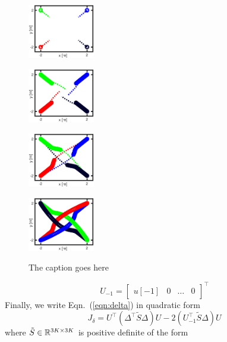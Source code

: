  \begin{figure}
 	\centering
 	\begin{subfloat}[]{
 		\includegraphics[width=0.26\textwidth]{figures/rail_a}}
 	\end{subfloat} \hspace{-5ex}
 	\begin{subfloat}[]{
 			\includegraphics[width=0.26\textwidth]{figures/rail_b}}
 	\end{subfloat} \hspace{-5ex}
 	\begin{subfloat}[]{
 			\includegraphics[width=0.26\textwidth]{figures/rail_c}}
 	\end{subfloat} \hspace{-5ex}
 	\begin{subfloat}[]{
 			\includegraphics[width=0.26\textwidth]{figures/rail_d}}
 	\end{subfloat} 
 	\caption{The caption goes here}
 \end{figure}

\begin{equation}
U_{-1} = \begin{bmatrix}
u[-1] & 0 & \ldots & 0
\end{bmatrix}^\top
\end{equation}
Finally, we write Eqn.~(\ref{eqn:delta}) in quadratic form
\begin{equation}
\label{eqn:var}
J_\delta = U^\top (\Delta^\top \tilde{S} \Delta) U - 2(U_{-1}^\top \tilde{S} \Delta )U
\end{equation}	
where $\tilde{S} \in {\mathbb R}^{3K \times 3K}$ is positive definite of the form

